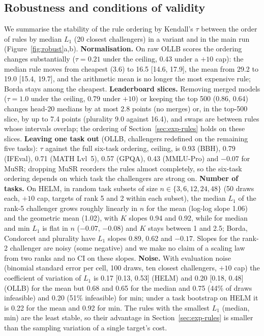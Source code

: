 \subsection{Robustness and conditions of validity}
\label{sec:exp-robust}
We summarise the stability of the rule ordering by Kendall's $\tau$ between the order of rules by median $L_1$ (20 closest challengers) in a variant and in the main run (Figure~\ref{fig:robust}a,b).
\textbf{Normalisation.} On raw OLLB scores the ordering changes substantially ($\tau=0.21$ under the ceiling, 0.43 under a $+10$ cap): the median rule moves from cheapest (3.6) to 16.5 [14.6, 17.9], the mean from 29.2 to 19.0 [15.4, 19.7], and the arithmetic mean is no longer the most expensive rule; Borda stays among the cheapest.
\textbf{Leaderboard slices.} Removing merged models ($\tau=1.0$ under the ceiling, 0.79 under $+10$) or keeping the top 500 (0.86, 0.64) changes head-20 medians by at most 2.8 points (no merges) or, in the top-500 slice, by up to 7.4 points (plurality 9.0 against 16.4), and swaps are between rules whose intervals overlap; the ordering of Section~\ref{sec:exp-rules} holds on these slices.
\textbf{Leaving one task out} (OLLB, challengers redefined on the remaining five tasks): $\tau$ against the full six-task ordering, ceiling, is 0.93 (BBH), 0.79 (IFEval), 0.71 (MATH Lvl~5), 0.57 (GPQA), 0.43 (MMLU-Pro) and $-0.07$ for MuSR; dropping MuSR reorders the rules almost completely, so the six-task ordering depends on which task the challengers are strong on.
\textbf{Number of tasks.} On HELM, in random task subsets of size $n\in\{3,6,12,24,48\}$ (50 draws each, $+10$ cap, targets of rank 5 and 2 within each subset), the median $L_1$ of the rank-5 challenger grows roughly linearly in $n$ for the mean (log-log slope 1.06) and the geometric mean (1.02), with $K$ slopes 0.94 and 0.92, while for median and min $L_1$ is flat in $n$ ($-0.07$, $-0.08$) and $K$ stays between 1 and 2.5; Borda, Condorcet and plurality have $L_1$ slopes 0.89, 0.62 and $-0.17$. Slopes for the rank-2 challenger are noisy (some negative) and we make no claim of a scaling law from two ranks and no CI on these slopes.
\textbf{Noise.} With evaluation noise (binomial standard error per cell, 100 draws, ten closest challengers, $+10$ cap) the coefficient of variation of $L_1$ is 0.17 [0.13, 0.53] (HELM) and 0.20 [0.18, 0.48] (OLLB) for the mean but 0.68 and 0.65 for the median and 0.75 (44\% of draws infeasible) and 0.20 (51\% infeasible) for min; under a task bootstrap on HELM it is 0.22 for the mean and 0.92 for min.
The rules with the smallest $L_1$ (median, min) are the least stable, so their advantage in Section~\ref{sec:exp-rules} is smaller than the sampling variation of a single target's cost.



